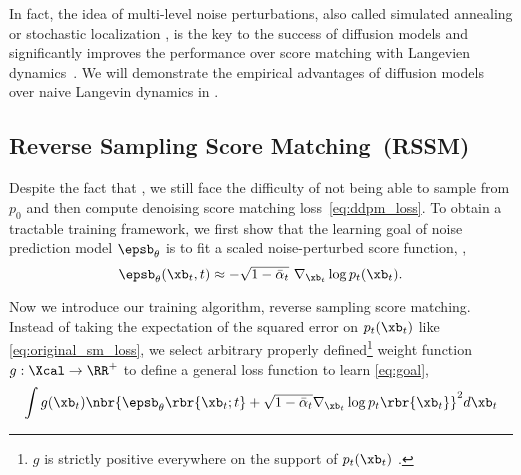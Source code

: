 In fact, the idea of multi-level noise perturbations, also called simulated annealing or stochastic localization , is the key to the success of diffusion models and significantly improves the performance over score matching with Langevien dynamics~\cite{song2019generative,ho2020denoising}. We will demonstrate the empirical advantages of diffusion models over naive Langevin dynamics in .


\subsection{Reverse Sampling Score Matching~(RSSM)}
\label{subsec:main_theorem}
Despite the fact that , we still face the difficulty of not being able to sample from $p_0$ and then compute denoising score matching loss~\eqref{eq:ddpm_loss}. To obtain a tractable training framework, we first show that the learning goal of noise prediction model $\epsb_\theta$ is to fit a scaled noise-perturbed score function,
\ie,
\begin{equation}
    \epsb_\theta(\xb_t, t)\approx-\sqrt{1 - \bar\alpha_t}~\nabla_{\xb_t}\log p_t(\xb_t)\label{eq:goal}.
\end{equation}


Now we introduce our training algorithm, reverse sampling score matching. Instead of taking the expectation of the squared error on $p_t(\xb_t)$ like \eqref{eq:original_sm_loss}, we select arbitrary properly defined\footnote{$g$ is strictly positive everywhere on the support of $p_t(\xb_t)$ .} weight function $g:\Xcal\to\RR^+$ to define a general loss function to learn \eqref{eq:goal},
\begin{equation}
    \int g(\xb_t)\nbr{\epsb_\theta\rbr{\xb_t;t} +\sqrt{1 - \bar\alpha_t} \nabla_{\xb_t}\log p_t\rbr{\xb_t}}^2d\xb_t \label{eq:reweighted_score_matching}
\end{equation}

